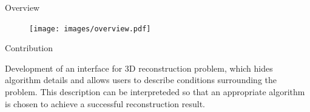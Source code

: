 \documentclass[10pt]{beamer}
\begin{document}
\begin{frame}{Overview}

\begin{figure}
\centering
\texttt{[image: images/overview.pdf]}
\end{figure}

\end{frame}

\begin{frame}{Contribution}

Development of an interface for 3D reconstruction problem, which hides algorithm details and allows users to describe conditions surrounding the problem. This description can be interpreteded so that an appropriate algorithm is chosen to achieve a successful reconstruction result.

\end{frame}




\end{document}
